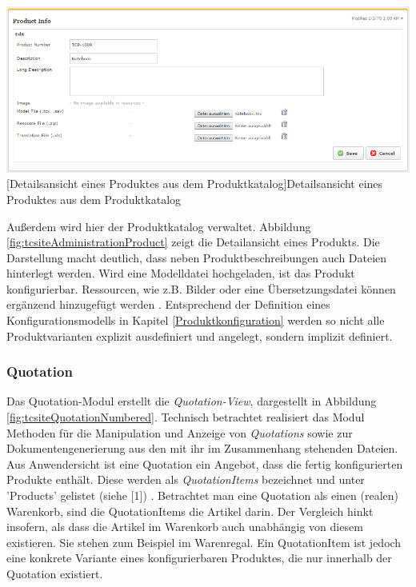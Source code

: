 \documentclass[11pt, a4paper, titlepage, listof=totoc, bibliography=totoc, index=totoc, twoside, openright, headings=normal]{scrreprt}
\begin{document}
\vspace{1em}
\begin{minipage}{\linewidth}
	\centering
	\includegraphics[width=1\linewidth]{Abbildungen/tcsiteAdministrationProduct.PNG}
	[Detailsansicht eines Produktes aus dem Produktkatalog]{Detailsansicht eines Produktes aus dem Produktkatalog}
	\label{fig:tcsiteAdministrationProduct}
\end{minipage}
\vspace{0.3em}

Außerdem wird hier der Produktkatalog verwaltet. Abbildung \ref{fig:tcsiteAdministrationProduct} zeigt die Detailansicht eines Produkts. Die Darstellung macht deutlich, dass neben Produktbeschreibungen auch Dateien hinterlegt werden. Wird eine Modelldatei hochgeladen, ist das Produkt konfigurierbar. Ressourcen, wie z.B. Bilder oder eine Übersetzungsdatei können ergänzend hinzugefügt werden \citep{tactonTCsiteReferenceManual}. Entsprechend der Definition eines Konfigurationsmodells in Kapitel \ref{Produktkonfiguration} werden so nicht alle Produktvarianten explizit ausdefiniert und angelegt, sondern implizit definiert.

\subsubsection*{Quotation}
Das Quotation-Modul erstellt die \emph{Quotation-View}, dargestellt in Abbildung \ref{fig:tcsiteQuotationNumbered}. Technisch betrachtet realisiert das Modul Methoden für die Manipulation und Anzeige von \emph{Quotations} sowie zur Dokumentengenerierung aus den mit ihr im Zusammenhang stehenden Dateien. Aus Anwendersicht ist eine Quotation ein Angebot, dass die fertig konfigurierten Produkte enthält. Diese werden als \emph{QuotationItems} bezeichnet und unter 'Products' gelistet (siehe [1]) \citep{tactonTCsiteDevelopmentManual}. Betrachtet man eine Quotation als einen (realen) Warenkorb, sind die QuotationItems die Artikel darin. Der Vergleich hinkt insofern, als dass die Artikel im Warenkorb auch unabhängig von diesem existieren. Sie stehen zum Beispiel im Warenregal. Ein QuotationItem ist jedoch eine konkrete Variante eines konfigurierbaren Produktes, die nur innerhalb der Quotation existiert.
\end{document}

